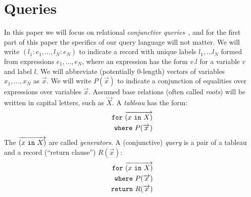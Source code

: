 \documentclass[preprint]{sigplanconf}
\newcommand{\FOR}{{\tt for}\relax\ifmmode\ \else\xspace\fi}
\newcommand{\WHERE}{{\tt where}\relax\ifmmode\ \else\xspace\fi}
\newcommand{\IN}{ \ {\tt in} \ }
\newcommand{\RETURN}{{\tt return}\relax\ifmmode\ \else\xspace\fi}
\begin{document}
\section{Queries}

In this paper we will focus on relational {\it conjunctive queries}~\cite{foundations}, and for the first part of this paper the specifics of our query language will not matter.   We will write $(l_1: e_1, \ldots, l_N: e_N)$ to indicate a record with unique labels $l_1, \ldots l_N$ formed from expressions $e_1, \ldots, e_N$, where an expression has the form $v.l$ for a variable $v$ and label $l$.  We will abbreviate (potentially 0-length) vectors of variables $x_1,...,x_N$ as $\overrightarrow{x}$.  We will write $P(\overrightarrow{x})$ to indicate a conjunction of equalities over expressions over variables $\overrightarrow{x}$.  Assumed base relations (often called {\it roots}) will be written in capital letters, such as $\overrightarrow{X}$.  A {\it tableau} has the form:
\begin{eqnarray*}
 & & \FOR \overrightarrow{(x \IN X)} \\
 & & \WHERE P(\overrightarrow{x})
\end{eqnarray*}
The $\overrightarrow{(x \IN X)}$ are called {\it generators}.  A (conjunctive) {\it query} is a pair of a  tableau and a record (``return clause'') $R(\overrightarrow{x})$:
\begin{eqnarray*}
 & & \FOR \overrightarrow{(x \IN X)} \\
& & \WHERE  P(\overrightarrow{x}) \\ 
 & & \RETURN R(\overrightarrow{x})
\end{eqnarray*}
\end{document}
